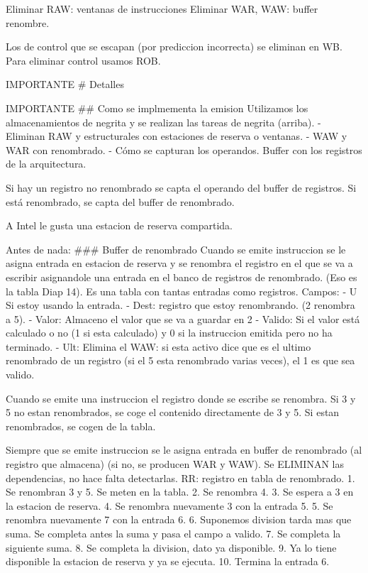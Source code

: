 Eliminar RAW: ventanas de instrucciones 
Eliminar WAR, WAW: buffer renombre.

Los de control que se escapan (por prediccion incorrecta) se eliminan en WB.
Para eliminar control usamos ROB.



IMPORTANTE
# Detalles

IMPORTANTE
## Como se implmementa la emision
Utilizamos los almacenamientos de negrita y se realizan las tareas de negrita (arriba).
- Eliminan RAW y estructurales con estaciones de reserva o ventanas.
- WAW y WAR con renombrado.
- Cómo se capturan los operandos. Buffer con los registros de la arquitectura.

Si hay un registro no renombrado se capta el operando del buffer de registros.
Si está renombrado, se capta del buffer de renombrado.




A Intel le gusta una estacion de reserva compartida.

Antes de nada:
### Buffer de renombrado
Cuando se emite instruccion se le asigna entrada en estacion de reserva y se renombra el registro en el que se va a escribir asignandole una entrada en el banco de registros de renombrado. (Eso es la tabla Diap 14). Es una tabla con tantas entradas como registros. Campos:
- U Si estoy usando la entrada.
- Dest: registro que estoy renombrando. (2 renombra a 5).
- Valor: Almaceno el valor que se va a guardar en 2
- Valido: Si el valor está calculado o no (1 si esta calculado) y 0 si la instruccion emitida pero no ha terminado.
- Ult: Elimina el WAW: si esta activo dice que es el ultimo renombrado de un registro (si el 5 esta renombrado varias veces), el 1 es que sea valido.

Cuando se emite una instruccion el registro donde se escribe se renombra.
Si 3 y 5 no estan renombrados, se coge el contenido directamente de 3 y 5. Si estan renombrados, se cogen de la tabla.

Siempre que se emite instruccion se le asigna entrada en buffer de renombrado (al registro que almacena) (si no, se producen WAR y WAW). Se ELIMINAN las dependencias, no hace falta detectarlas.
RR: registro en tabla de renombrado.
1. Se renombran 3 y 5. Se meten en la tabla.
2. Se renombra 4.
3. Se espera a 3 en la estacion de reserva.
4. Se renombra nuevamente 3 con la entrada 5.
5. Se renombra nuevamente 7 con la entrada 6.
6. Suponemos division tarda mas que suma. Se completa antes la suma y pasa el campo a valido.
7. Se completa la siguiente suma.
8. Se completa la division, dato ya disponible.
9. Ya lo tiene disponible la estacion de reserva y ya se ejecuta.
10. Termina la entrada 6.

